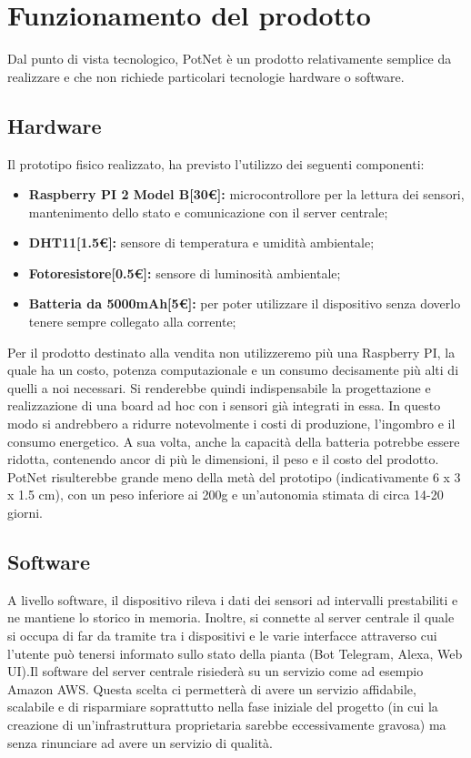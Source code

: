 \newpage
\section{Funzionamento del prodotto}

Dal punto di vista tecnologico, PotNet è un prodotto relativamente semplice da realizzare e che non richiede particolari tecnologie hardware o software. 

\subsection{Hardware}

Il prototipo fisico realizzato, ha previsto l'utilizzo dei seguenti componenti:

\begin{itemize}
	\item \textbf{Raspberry PI 2 Model B[30€]:} microcontrollore per la lettura dei sensori, mantenimento dello stato e comunicazione con il server centrale;
	\item \textbf{DHT11[1.5€]:} sensore di temperatura e umidità ambientale;
	\item \textbf{Fotoresistore[0.5€]:} sensore di luminosità ambientale;
	\item \textbf{Batteria da 5000mAh[5€]:} per poter utilizzare il dispositivo senza doverlo tenere sempre collegato alla corrente;
\end{itemize}

Per il prodotto destinato alla vendita non utilizzeremo più una Raspberry PI, la quale ha un costo, potenza computazionale e un consumo decisamente più alti di quelli a noi necessari. Si renderebbe quindi indispensabile la progettazione e realizzazione di una board ad hoc con i sensori già integrati in essa. In questo modo si andrebbero a ridurre notevolmente i costi di produzione, l'ingombro e il consumo energetico. A sua volta, anche la capacità della batteria potrebbe essere ridotta, contenendo ancor di più le dimensioni, il peso e il costo del prodotto. PotNet risulterebbe grande meno della metà del prototipo (indicativamente 6 x 3 x 1.5 cm), con un peso inferiore ai 200g e un'autonomia stimata di circa 14-20 giorni.

\subsection{Software}

A livello software, il dispositivo rileva i dati dei sensori ad intervalli prestabiliti e ne mantiene lo storico in memoria. Inoltre, si connette al server centrale il quale si occupa di far da tramite tra i dispositivi e le varie interfacce attraverso cui l'utente può tenersi informato sullo stato della pianta (Bot Telegram, Alexa, Web UI).\newline\newline Il software del server centrale risiederà su un servizio come ad esempio Amazon AWS. Questa scelta ci permetterà di avere un servizio affidabile, scalabile e di risparmiare soprattutto nella fase iniziale del progetto (in cui la creazione di un'infrastruttura proprietaria sarebbe eccessivamente gravosa) ma senza rinunciare ad avere un servizio di qualità.

